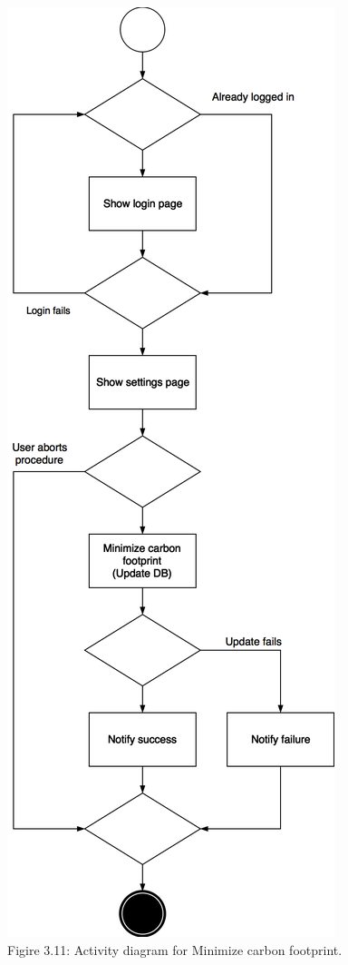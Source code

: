 \documentclass{article}
\begin{document}
	\begin{center}
		\includegraphics[scale=0.25]{img/diagrams/minimize_carbon_footprint_ad.png} \\ \bigskip
		Figire 3.11: Activity diagram for Minimize carbon footprint.
	\end{center}
	\newpage
\end{document}
